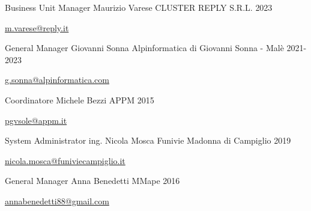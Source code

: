 

\begin{cventries}

\cventry
{Business Unit Manager} %
{Maurizio Varese} %
{CLUSTER REPLY S.R.L.} %
{2023} %
{
  \begin{cvitems} %
    \item {\href{mailto:m.varese@reply.it}{m.varese@reply.it}}
  \end{cvitems}
}

\cventry
{General Manager} %
{Giovanni Sonna} %
{Alpinformatica di Giovanni Sonna - Malè} %
{2021-2023} %
{
  \begin{cvitems} %
    \item {\href{mailto:g.sonna@alpinformatica.com}{g.sonna@alpinformatica.com}}
  \end{cvitems}
}

  \cventry
    {Coordinatore} %
    {Michele Bezzi} %
    {APPM} %
    {2015} %
    {
      \begin{cvitems} %
        \item {\href{mailto:pgvsole@appm.it}{pgvsole@appm.it}}
      \end{cvitems}
    }

  \cventry
    {System Administrator} %
    {ing. Nicola Mosca} %
    {Funivie Madonna di Campiglio} %
    {2019} %
    {
      \begin{cvitems} %
        \item {\href{mailto:nicola.mosca@funiviecampiglio.it}{nicola.mosca@funiviecampiglio.it}}
      \end{cvitems}
    }

  \cventry
    {General Manager} %
    {Anna Benedetti} %
    {MMape} %
    {2016} %
    {
      \begin{cvitems} %
        \item {\href{mailto:annabenedetti88@gmail.com}{annabenedetti88@gmail.com}}
      \end{cvitems}
    }
 
\end{cventries}
